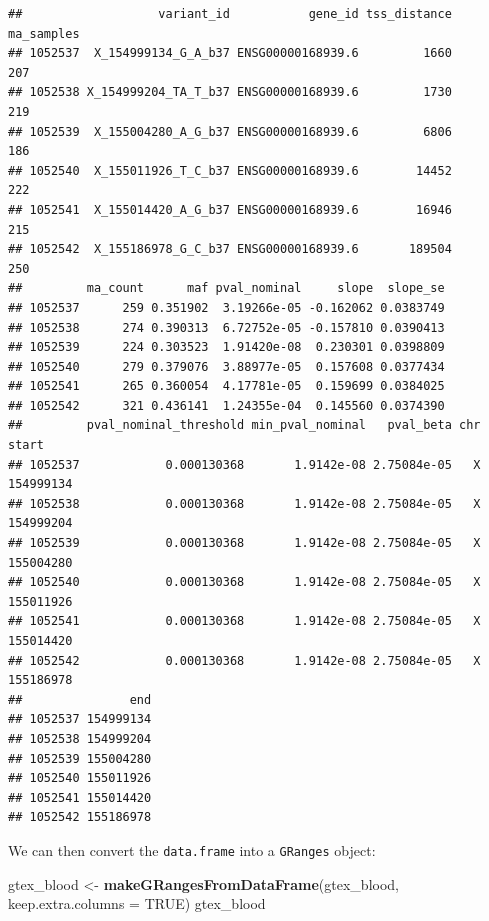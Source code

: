 \documentclass[9pt,a4paper,]{extarticle}
\newenvironment{Shaded}{\begin{snugshade}}{\end{snugshade}}
\newcommand{\KeywordTok}[1]{\textcolor[rgb]{0.13,0.29,0.53}{\textbf{#1}}}
\newcommand{\DataTypeTok}[1]{\textcolor[rgb]{0.13,0.29,0.53}{#1}}
\newcommand{\StringTok}[1]{\textcolor[rgb]{0.31,0.60,0.02}{#1}}
\newcommand{\OtherTok}[1]{\textcolor[rgb]{0.56,0.35,0.01}{#1}}
\newcommand{\NormalTok}[1]{#1}
\begin{document}
\begin{verbatim}
##                   variant_id           gene_id tss_distance ma_samples
## 1052537  X_154999134_G_A_b37 ENSG00000168939.6         1660        207
## 1052538 X_154999204_TA_T_b37 ENSG00000168939.6         1730        219
## 1052539  X_155004280_A_G_b37 ENSG00000168939.6         6806        186
## 1052540  X_155011926_T_C_b37 ENSG00000168939.6        14452        222
## 1052541  X_155014420_A_G_b37 ENSG00000168939.6        16946        215
## 1052542  X_155186978_G_C_b37 ENSG00000168939.6       189504        250
##         ma_count      maf pval_nominal     slope  slope_se
## 1052537      259 0.351902  3.19266e-05 -0.162062 0.0383749
## 1052538      274 0.390313  6.72752e-05 -0.157810 0.0390413
## 1052539      224 0.303523  1.91420e-08  0.230301 0.0398809
## 1052540      279 0.379076  3.88977e-05  0.157608 0.0377434
## 1052541      265 0.360054  4.17781e-05  0.159699 0.0384025
## 1052542      321 0.436141  1.24355e-04  0.145560 0.0374390
##         pval_nominal_threshold min_pval_nominal   pval_beta chr     start
## 1052537            0.000130368       1.9142e-08 2.75084e-05   X 154999134
## 1052538            0.000130368       1.9142e-08 2.75084e-05   X 154999204
## 1052539            0.000130368       1.9142e-08 2.75084e-05   X 155004280
## 1052540            0.000130368       1.9142e-08 2.75084e-05   X 155011926
## 1052541            0.000130368       1.9142e-08 2.75084e-05   X 155014420
## 1052542            0.000130368       1.9142e-08 2.75084e-05   X 155186978
##               end
## 1052537 154999134
## 1052538 154999204
## 1052539 155004280
## 1052540 155011926
## 1052541 155014420
## 1052542 155186978
\end{verbatim}

We can then convert the \texttt{data.frame} into a \texttt{GRanges} object:

\begin{Shaded}
\begin{Highlighting}[]
\NormalTok{gtex_blood <-}\StringTok{ }\KeywordTok{makeGRangesFromDataFrame}\NormalTok{(gtex_blood, }\DataTypeTok{keep.extra.columns =} \OtherTok{TRUE}\NormalTok{)}
\NormalTok{gtex_blood}
\end{Highlighting}
\end{Shaded}
\end{document}

